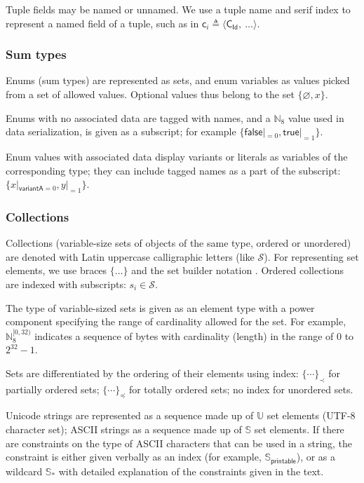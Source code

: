 \documentclass[9pt,oneside]{amsart}
\begin{document}
\begin{multicols}{2}
Tuple fields may be named or unnamed.
We use a tuple name and serif index to represent a named field of a tuple,
such as in $\mathsf{c}_i \triangleq \langle \mathsf{C_{Id}}, \ \ldots \rangle$.

\subsubsection{Sum types}

Enums (sum types) are represented as sets, and enum variables as values
picked from a set of allowed values.
Optional values thus belong to the set $\{ \varnothing, x \}$.

Enums with no associated data are tagged with names,
and a $\mathbb{N}_8$ value used in data serialization, is given as a subscript;
for example $\{ \mathsf{false}|_{=0}, \mathsf{true}|_{=1} \}$.

Enum values with associated data display variants or literals as variables of the corresponding type;
they can include tagged names as a part of the subscript: $\{ x|_{\mathsf{variantA}=0}, y|_{=1} \}$.

\subsubsection{Collections}

Collections (variable-size sets of objects of the same type, ordered or unordered)
are denoted with Latin uppercase calligraphic letters (like $\mathcal{S}$).
For representing set elements, we use braces $\{\ldots\}$ and the set builder notation \cite{setbuilder}.
Ordered collections are indexed with subscripts: $s_i \in \mathcal{S}$.

The type of variable-sized sets is given as an element type with a power component
specifying the range of cardinality allowed for the set.
For example, $\mathbb{N}_8^{[0, 32)}$ indicates a sequence of bytes with cardinality (length)
in the range of $0$ to $2^{32} - 1$.

Sets are differentiated by the ordering of their elements using index:
$\{ \cdots \}_\prec$ for partially ordered sets;
$\{ \cdots \}_\preceq$ for totally ordered sets;
no index for unordered sets.

Unicode strings are represented as a sequence made up of $\mathbb{U}$ set elements
(UTF-8 character set); ASCII strings as a sequence made up of $\mathbb{S}$ set elements.
If there are constraints on the type of ASCII characters that can be used in a string,
the constraint is either given verbally as an index (for example, $\mathbb{S}_\mathsf{printable}$),
or as a wildcard $\mathbb{S}_*$ with detailed explanation of the constraints given in the text.


\end{multicols}
\end{document}
